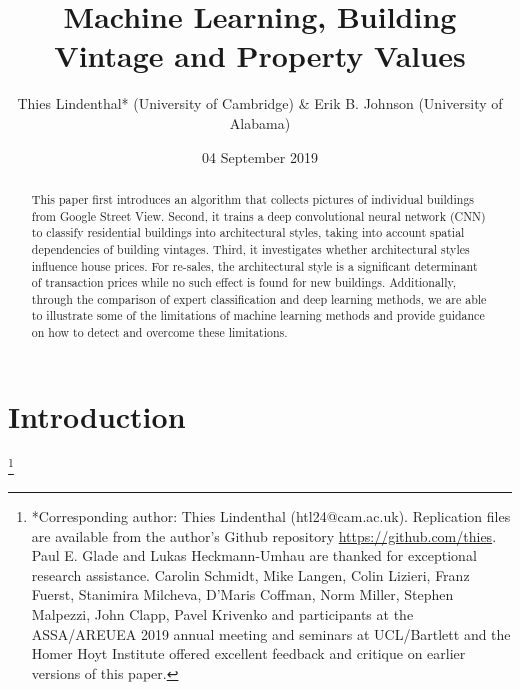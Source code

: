 \documentclass[]{article}
\title{Machine Learning, Building Vintage and Property Values}
\author{Thies Lindenthal* (University of Cambridge) \& Erik B. Johnson
(University of Alabama)}
\date{04 September 2019}
\let\rmarkdownfootnote\footnote%
\def\footnote{\protect\rmarkdownfootnote}
\begin{document}
\maketitle
\begin{abstract}
This paper first introduces an algorithm that collects pictures of
individual buildings from Google Street View. Second, it trains a deep
convolutional neural network (CNN) to classify residential buildings
into architectural styles, taking into account spatial dependencies of
building vintages. Third, it investigates whether architectural styles
influence house prices. For re-sales, the architectural style is a
significant determinant of transaction prices while no such effect is
found for new buildings. Additionally, through the comparison of expert
classification and deep learning methods, we are able to illustrate some
of the limitations of machine learning methods and provide guidance on
how to detect and overcome these limitations.
\end{abstract}

\hypertarget{introduction}{%
\section{Introduction}\label{introduction}}

\let\svthefootnote\thefootnote
\let\thefootnote\relax

\footnote{{*Corresponding author: Thies Lindenthal (htl24@cam.ac.uk). Replication files are available from the author's Github repository \href{https://github.com/thies}{https://github.com/thies}. Paul E. Glade and Lukas Heckmann-Umhau are thanked for exceptional research assistance. Carolin Schmidt, Mike Langen, Colin Lizieri, Franz Fuerst, Stanimira Milcheva, D'Maris Coffman, Norm Miller, Stephen Malpezzi, John Clapp, Pavel Krivenko and participants at the ASSA/AREUEA 2019 annual meeting and seminars at UCL/Bartlett and the Homer Hoyt Institute offered excellent feedback and critique on earlier versions of this paper.}}

\addtocounter{footnote}{-1}\let\thefootnote\svthefootnote
\end{document}
